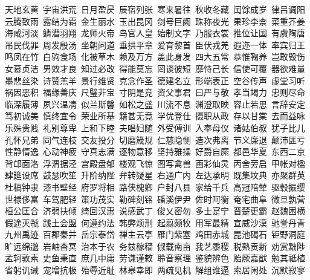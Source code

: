 天地玄黄~宇宙洪荒~日月盈昃~辰宿列张~寒来暑往~秋收冬藏~闰馀成岁~律吕调阳\\
云腾致雨~露结为霜~金生丽水~玉出昆冈~剑号巨阙~珠称夜光~果珍李柰~菜重芥姜\\
海咸河淡~鳞潜羽翔~龙师火帝~鸟官人皇~始制文字~乃服衣裳~推位让国~有虞陶唐\\
吊民伐罪~周发殷汤~坐朝问道~垂拱平章~爱育黎首~臣伏戎羌~遐迩一体~率宾归王\\
鸣凤在竹~白驹食场~化被草木~赖及万方~盖此身发~四大五常~恭惟鞠养~岂敢毁伤\\
女慕贞洁~男效才良~知过必改~得能莫忘~罔谈彼短~靡恃己长~信使可覆~器欲难量\\
墨悲丝染~诗赞羔羊~景行维贤~克念作圣~德建名立~形端表正~空谷传声~虚堂习听\\
祸因恶积~福缘善庆~尺璧非宝~寸阴是竞~资父事君~曰严与敬~孝当竭力~忠则尽命\\
临深履薄~夙兴温凊~似兰斯馨~如松之盛~川流不息~渊澄取映~容止若思~言辞安定\\
笃初诚美~慎终宜令~荣业所基~籍甚无竟~学优登仕~摄职从政~存以甘棠~去而益咏\\
乐殊贵贱~礼别尊卑~上和下睦~夫唱妇随~外受傅训~入奉母仪~诸姑伯叔~犹子比儿\\
孔怀兄弟~同气连枝~交友投分~切磨箴规~仁慈隐恻~造次弗离~节义廉退~颠沛匪亏\\
性静情逸~心动神疲~守真志满~逐物意移~坚持雅操~好爵自縻~都邑华夏~东西二京\\
背邙面洛~浮渭据泾~宫殿盘郁~楼观飞惊~图写禽兽~画彩仙灵~丙舍旁启~甲帐对楹\\
肆筵设席~鼓瑟吹笙~升阶纳陛~弁转疑星~右通广内~左达承明~既集坟典~亦聚群英\\
杜稿钟隶~漆书壁经~府罗将相~路侠槐卿~户封八县~家给千兵~高冠陪辇~驱毂振缨\\
世禄侈富~车驾肥轻~策功茂实~勒碑刻铭~磻溪伊尹~佐时阿衡~奄宅曲阜~微旦孰营\\
桓公匡合~济弱扶倾~绮回汉惠~说感武丁~俊乂密勿~多士寔宁~晋楚更霸~赵魏困横\\
假途灭虢~践土会盟~何遵约法~韩弊烦刑~起翦颇牧~用军最精~宣威沙漠~驰誉丹青\\
九州禹迹~百郡秦并~岳宗泰岱~禅主云亭~雁门紫塞~鸡田赤城~昆池碣石~钜野洞庭\\
旷远绵邈~岩岫杳冥~治本于农~务兹稼穑~俶载南亩~我艺黍稷~税熟贡新~劝赏黜陟\\
孟轲敦素~史鱼秉直~庶几中庸~劳谦谨敕~聆音察理~鉴貌辨色~贻厥嘉猷~勉其祗植\\
省躬讥诫~宠增抗极~殆辱近耻~林皋幸即~两疏见机~解组谁逼~索居闲处~沉默寂寥\\
